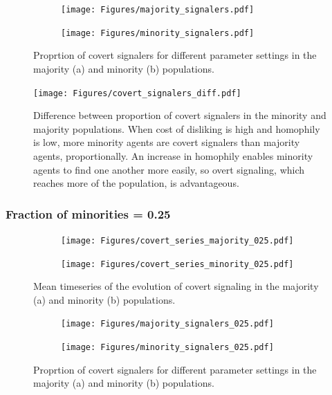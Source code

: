 \documentclass[11pt,letterpaper]{article}
\begin{document}
\begin{figure}[H]
  \centering
  \begin{subfigure}{0.49\textwidth}
    \centering
    \texttt{[image: Figures/majority\_signalers.pdf]}
    \caption{}
    \label{fig:}
  \end{subfigure}
  \begin{subfigure}{0.49\textwidth}
    \centering
    \texttt{[image: Figures/minority\_signalers.pdf]}
    \caption{}
    \label{fig:}
  \end{subfigure}
  \caption{Proprtion of covert signalers for different parameter settings in the
    majority (a) and minority (b) populations.}
  \label{fig:regressions}
\end{figure}

\begin{figure}[H]
  \centering
    \texttt{[image: Figures/covert\_signalers\_diff.pdf]}
  \caption{Difference between proportion of covert signalers in the minority 
    and majority populations. When cost of disliking is high and homophily is 
    low, more minority agents are covert signalers than majority agents,
    proportionally. An increase in homophily enables minority agents to 
    find one another more easily, so overt signaling, which reaches more of
    the population, is advantageous.
  }
  \label{fig:}
\end{figure}

\subsubsection{Fraction of minorities = 0.25}

\begin{figure}[H]
  \centering
  \begin{subfigure}{0.49\textwidth}
    \centering
    \texttt{[image: Figures/covert\_series\_majority\_025.pdf]}
    \caption{}
    \label{fig:}
  \end{subfigure}
  \begin{subfigure}{0.49\textwidth}
    \centering
    \texttt{[image: Figures/covert\_series\_minority\_025.pdf]}
    \caption{}
    \label{fig:}
  \end{subfigure}
  \caption{Mean timeseries of the evolution of covert signaling in the
    majority (a) and minority (b) populations.}
  \label{fig:regressions}
\end{figure}


\begin{figure}[H]
  \centering
  \begin{subfigure}{0.49\textwidth}
    \centering
    \texttt{[image: Figures/majority\_signalers\_025.pdf]}
    \caption{}
    \label{fig:}
  \end{subfigure}
  \begin{subfigure}{0.49\textwidth}
    \centering
    \texttt{[image: Figures/minority\_signalers\_025.pdf]}
    \caption{}
    \label{fig:}
  \end{subfigure}
  \caption{Proprtion of covert signalers for different parameter settings in the
    majority (a) and minority (b) populations.}
  \label{fig:regressions}
\end{figure}
\end{document}

